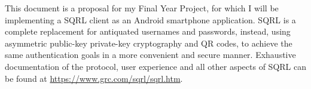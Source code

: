 This document is a proposal for my Final Year Project, for which I will be implementing a SQRL client as an Android smartphone application. SQRL is a complete replacement for antiquated usernames and passwords, instead, using asymmetric public-key private-key cryptography and QR codes, to achieve the same authentication goals in a more convenient and secure manner. Exhaustive documentation of the protocol, user experience and all other aspects of SQRL can be found at \url{https://www.grc.com/sqrl/sqrl.htm}.
